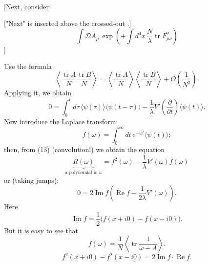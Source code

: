 [Next, consider

["Next" is inserted above the crossed-out
.]
\begin{equation*}
\int\mathcal D A_\mu\,\exp\left(+\int d^4x\,\frac N\lambda
\operatorname{tr}F_{\mu\nu}^2\right) \tag{11}
\end{equation*}
]

Use the formula
\begin{equation*}
\left\langle\frac{\operatorname{tr}A}N\frac{\operatorname{tr}B}N\right\rangle
=\left\langle\frac{\operatorname{tr}A}N\right\rangle
\left\langle\frac{\operatorname{tr}B}N\right\rangle
+O\left(\frac1{N^2}\right). \tag{12}
\end{equation*}
Applying it, we obtain
\begin{equation*}
0=\int_0^t d\tau\,\langle\psi(\tau)\rangle\langle\psi(t-\tau)\rangle
-\frac1\lambda V'\left(\frac{\partial}{\partial t}\right)\langle\psi(t)\rangle. \tag{13}
\end{equation*}
Now introduce the Laplace transform:
\begin{equation*}
f(\omega)=\int_0^\infty dt\,e^{-\omega t}\langle\psi(t)\rangle; \tag{14}
\end{equation*}
then, from (13) (convolution!)
 we obtain the equation
\begin{equation*}
\underbrace{R(\omega)}_{\text{a polynomial in }\omega}
=f^2(\omega)-\frac1\lambda V'(\omega)f(\omega) \tag{15}
\end{equation*}
or (taking jumps):
\begin{equation*}
0=2\operatorname{Im}f\left(\operatorname{Re}f-\frac1{2\lambda}V'(\omega)\right). \tag{16}
\end{equation*}
Here
\begin{equation*}
\operatorname{Im}f=\frac12\bigl(f(x+i0)-f(x-i0)\bigr). \tag{17}
\end{equation*}
But it is easy to see that
\begin{equation*}
f(\omega)=\frac1N\left\langle\operatorname{tr}\frac1{\omega-A}\right\rangle. \tag{18}
\end{equation*}
\begin{equation*}
f^2(x+i0)-f^2(x-i0)=2\operatorname{Im}f\cdot\operatorname{Re}f. \tag{19}
\end{equation*}

